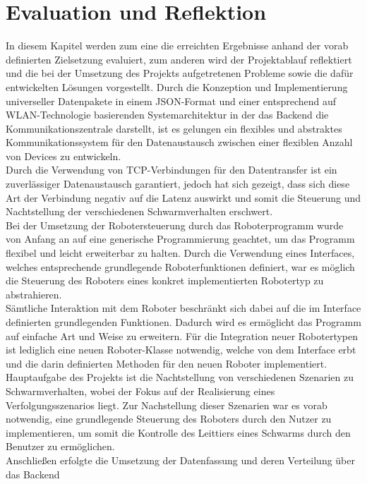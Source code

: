 \section{Evaluation und Reflektion}
In diesem Kapitel werden zum eine die erreichten Ergebnisse anhand der vorab definierten Zielsetzung evaluiert, zum anderen wird der Projektablauf reflektiert und die bei der Umsetzung des Projekts aufgetretenen Probleme sowie die dafür entwickelten Lösungen vorgestellt.
\medskip
\newline
Durch die Konzeption und Implementierung universeller Datenpakete in einem JSON-Format und einer entsprechend auf WLAN-Technologie basierenden Systemarchitektur in der das Backend die Kommunikationszentrale darstellt, ist es gelungen ein flexibles und abstraktes Kommunikationssystem 
für den Datenaustausch zwischen einer flexiblen Anzahl von Devices zu entwickeln. \\
Durch die Verwendung von TCP-Verbindungen für den Datentransfer ist ein zuverlässiger Datenaustausch garantiert, jedoch hat sich gezeigt, dass sich diese Art der Verbindung negativ auf die Latenz auswirkt und somit die Steuerung und Nachtstellung der verschiedenen Schwarmverhalten erschwert.
\\
Bei der Umsetzung der Robotersteuerung durch das Roboterprogramm wurde von Anfang an auf eine generische Programmierung geachtet, um das Programm flexibel und leicht erweiterbar zu halten. Durch die Verwendung eines Interfaces, welches entsprechende grundlegende Roboterfunktionen definiert, war es möglich die Steuerung des Roboters eines konkret implementierten Robotertyp zu abstrahieren. \\
Sämtliche Interaktion mit dem Roboter beschränkt sich dabei auf die im Interface definierten grundlegenden Funktionen. Dadurch wird es ermöglicht das Programm auf einfache Art und Weise zu erweitern. Für die Integration neuer Robotertypen ist lediglich eine neuen Roboter-Klasse notwendig, welche von dem Interface
erbt und die darin definierten Methoden für den neuen Roboter implementiert.
\medskip
\newline
Hauptaufgabe des Projekts ist die Nachtstellung von verschiedenen Szenarien zu Schwarmverhalten, wobei der Fokus auf der Realisierung eines Verfolgungsszenarios liegt. Zur Nachstellung dieser Szenarien war es vorab notwendig, eine grundlegende Steuerung des Roboters durch den Nutzer zu implementieren, um somit die Kontrolle des Leittiers eines Schwarms durch den Benutzer zu ermöglichen. \\
Anschließen erfolgte die Umsetzung der Datenfassung und deren Verteilung über das Backend 
